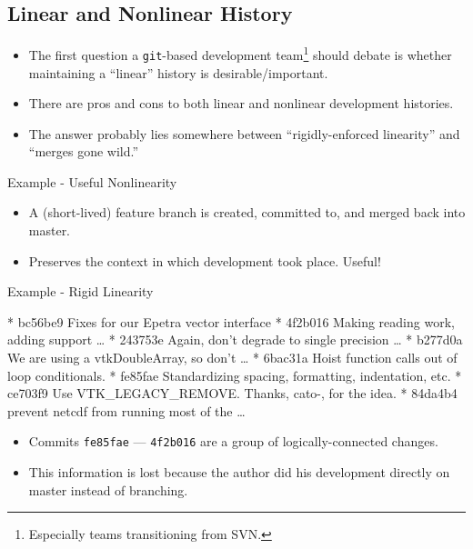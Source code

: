 \documentclass[mathserif]{beamer}
\begin{document}
\subsection{Linear and Nonlinear History}

\begin{frame}{}
  \begin{itemize}\itemsep=.05\textheight
  \item The first question a \texttt{git}-based development team\footnote{Especially teams transitioning from SVN.} should debate
    is whether maintaining a ``linear'' history is desirable/important.
  \item There are pros and cons to both linear and nonlinear development histories.
  \item The answer probably lies somewhere between ``rigidly-enforced linearity'' and ``merges gone wild.''
  \end{itemize}
\end{frame}


\begin{frame}[fragile]{Example - Useful Nonlinearity}
\small
{}
\begin{itemize}
\item A (short-lived) feature branch is created, committed to, and merged back into master.
\item Preserves the context in which development took place.  Useful!
\end{itemize}
\end{frame}



\begin{frame}[fragile]{Example - Rigid Linearity}
\small
\begin{semiverbatim}
* bc56be9 Fixes for our Epetra vector interface
* 4f2b016 Making reading work, adding support \ldots
* 243753e Again, don't degrade to single precision \ldots
* b277d0a We are using a vtkDoubleArray, so don't \ldots
* 6bac31a Hoist function calls out of loop conditionals.
* fe85fae Standardizing spacing, formatting, indentation, etc.
* ce703f9 Use VTK_LEGACY_REMOVE.  Thanks, cato-, for the idea.
* 84da4b4 prevent netcdf from running most of the \ldots
\end{semiverbatim}
\begin{itemize}
\item Commits \texttt{fe85fae} --- \texttt{4f2b016} are a group of logically-connected changes.
\item This information is lost because the author did his development directly on master instead of branching.
\end{itemize}
\end{frame}
\end{document}
